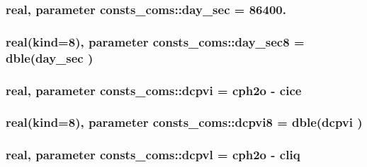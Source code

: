 \subsubsection[{\texorpdfstring{day\+\_\+sec}{day_sec}}]{\setlength{\rightskip}{0pt plus 5cm}real, parameter consts\+\_\+coms\+::day\+\_\+sec = 86400.}\hypertarget{namespaceconsts__coms_a3ff38434ac06e17e92b1929696b56611}{}\label{namespaceconsts__coms_a3ff38434ac06e17e92b1929696b56611}
\subsubsection[{\texorpdfstring{day\+\_\+sec8}{day_sec8}}]{\setlength{\rightskip}{0pt plus 5cm}real(kind=8), parameter consts\+\_\+coms\+::day\+\_\+sec8 = dble({\bf day\+\_\+sec} )}\hypertarget{namespaceconsts__coms_a00c8967ff3769c4a31bd909961104e13}{}\label{namespaceconsts__coms_a00c8967ff3769c4a31bd909961104e13}
\subsubsection[{\texorpdfstring{dcpvi}{dcpvi}}]{\setlength{\rightskip}{0pt plus 5cm}real, parameter consts\+\_\+coms\+::dcpvi = {\bf cph2o} -\/ {\bf cice}}\hypertarget{namespaceconsts__coms_a2469770a4505b267d92ea0c4c78ba886}{}\label{namespaceconsts__coms_a2469770a4505b267d92ea0c4c78ba886}
\subsubsection[{\texorpdfstring{dcpvi8}{dcpvi8}}]{\setlength{\rightskip}{0pt plus 5cm}real(kind=8), parameter consts\+\_\+coms\+::dcpvi8 = dble({\bf dcpvi} )}\hypertarget{namespaceconsts__coms_ae6c5bc2e2b10660ff626e4299ea10988}{}\label{namespaceconsts__coms_ae6c5bc2e2b10660ff626e4299ea10988}
\subsubsection[{\texorpdfstring{dcpvl}{dcpvl}}]{\setlength{\rightskip}{0pt plus 5cm}real, parameter consts\+\_\+coms\+::dcpvl = {\bf cph2o} -\/ {\bf cliq}}\hypertarget{namespaceconsts__coms_a3d8b2bc618a2be7053f0eefeafff6646}{}\label{namespaceconsts__coms_a3d8b2bc618a2be7053f0eefeafff6646}
